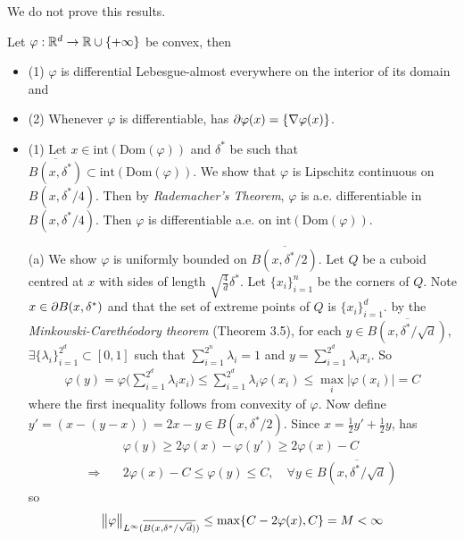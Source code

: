 \documentclass[12pt,a4paper]{article}
\newenvironment{proof}
{\begin{changemargin}{1cm}{0.5cm} 
	}%
	{\end{changemargin}
}
\renewenvironment{i}
{\begin{itemize} 
	}%
	{\end{itemize}
}
\newenvironment{p}
{\begin{proof} 
	}%
	{\end{proof}
}
\begin{document}
\quad We do not prove this results.
\s

 Let $\varphi : \mathbb{R}^d \rightarrow \mathbb{R} \cup \{+\infty \}$ be convex, then
\begin{i}
\item[(1)] $\varphi$ is differential Lebesgue-almost everywhere on the interior of its domain and
\item[(2)] Whenever $\varphi$ is differentiable, has $\partial \varphi(x) = \{\nabla \varphi(x) \}$.
\end{i}
\begin{p}
\pf \begin{i}
\item[(1)] Let $x\in \text{int}(\text{Dom}(\varphi))$ and $\delta^*$ be such that $\overline{B(x, \delta^*)} \subset \text{int}(\text{Dom}(\varphi))$. We show that $\varphi$ is Lipschitz continuous on $B(x, \delta^*/4)$. Then by \emph{Rademacher's Theorem}, $\varphi$ is a.e. differentiable in $B(x, \delta^*/4)$. Then $\varphi$ is differentiable a.e. on $\text{int}(\text{Dom}(\varphi))$.

(a) We show $\varphi$ is uniformly bounded on $\overline{B(x, \delta^*/2)}$. Let $Q$ be a cuboid centred at $x$ with sides of length $\sqrt{\frac{4}{d}} \delta^*$. Let $\{x_i\}_{i=1}^n$ be the corners of $Q$. Note $x\in \partial B(x, \delta^*)$ and that the set of extreme points of $Q$ is $\{x_i \}_{i=1}^d$. by the \emph{Minkowski-Careth\'{e}odory theorem} (Theorem 3.5), for each $y \in \overline{B(x, \delta^*/\sqrt{d})}$, $\exists \{\lambda_i \}_{i=1}^{2^d} \subset [0,1]$ such that $\sum_{i=1}^{2^n} \lambda_i =1$ and $y = \sum_{i=1}^{2^d} \lambda_i x_i$. So
\begin{align*}
\varphi(y) = \varphi \big( \sum_{i=1}^{2^d} \lambda_i x_i \big) \leq \sum_{i=1}^{2^d} \lambda_i \varphi(x_i) \leq \max_{i} |\varphi(x_i)| =C
\end{align*}
where the first inequality follows from convexity of $\varphi$. Now define $y' = (x-(y-x)) = 2x-y \in B(x, \delta^*/2)$. Since $x= \frac{1}{2} y' + \frac{1}{2}y$, has
\begin{align*}
& \varphi(y) \geq 2\varphi(x) - \varphi(y') \geq 2\varphi(x) - C  \\
\Rightarrow \quad & 2\varphi(x) - C \leq \varphi(y) \leq C, \quad \forall y\in \overline{B(x, \delta^*/\sqrt{d} )}
\end{align*}
so 
\begin{align*}
\bigl\lVert\varphi\bigr\rVert_{L^{\infty}(\overline{B(x, \delta^*/\sqrt{d})})} \leq \max \{C- 2\varphi(x), C\} = M < \infty
\end{align*}


\end{i}
\end{p}
\end{document}
